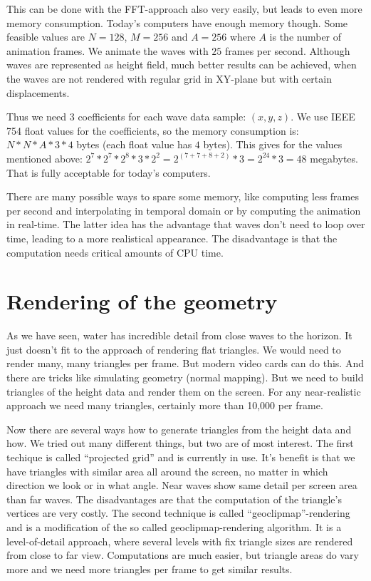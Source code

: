 \documentclass[english,a4paper,12pt]{report}
\begin{document}
This can be done with the FFT-approach also very easily, but leads to
even more memory consumption. Today's computers have enough memory
though. Some feasible values are $N=128$, $M=256$ and $A=256$ where $A$
is the number of animation frames. We animate the waves with $25$ frames
per second. Although waves are represented as height field, much better
results can be achieved, when the waves are not rendered with regular
grid in XY-plane but with certain displacements.

Thus we need $3$ coefficients for each wave data sample: $(x,y,z)$. We
use IEEE 754 float values for the coefficients, so the memory
consumption is: $N*N*A*3*4$ bytes (each float value has $4$ bytes). This
gives for the values mentioned above:
$2^7*2^7*2^8*3*2^2=2^{(7+7+8+2)}*3=2^{24}*3=48$ megabytes. That is fully
acceptable for today's computers.

There are many possible ways to spare some memory, like computing less
frames per second and interpolating in temporal domain or by computing
the animation in real-time. The latter idea has the advantage that waves
don't need to loop over time, leading to a more realistical appearance.
The disadvantage is that the computation needs critical amounts of CPU
time.

\section{Rendering of the geometry}

As we have seen, water has incredible detail from close waves to the
horizon. It just doesn't fit to the approach of rendering flat
triangles. We would need to render many, many triangles per frame. But
modern video cards can do this. And there are tricks like simulating
geometry (normal mapping). But we need to build triangles of the height
data and render them on the screen. For any near-realistic approach we
need many triangles, certainly more than 10,000 per frame.

Now there are several ways how to generate triangles from the height
data and how. We tried out many different things, but two are of most
interest. The first techique is called ``projected grid'' and is
currently in use. It's benefit is that we have triangles with similar
area all around the screen, no matter in which direction we look or in
what angle. Near waves show same detail per screen area than far waves.
The disadvantages are that the computation of the triangle's vertices
are very costly. The second technique is called ``geoclipmap''-rendering
and is a modification of the so called geoclipmap-rendering algorithm.
It is a level-of-detail approach, where several levels with fix triangle
sizes are rendered from close to far view. Computations are much easier,
but triangle areas do vary more and we need more triangles per frame to
get similar results.
\end{document}
